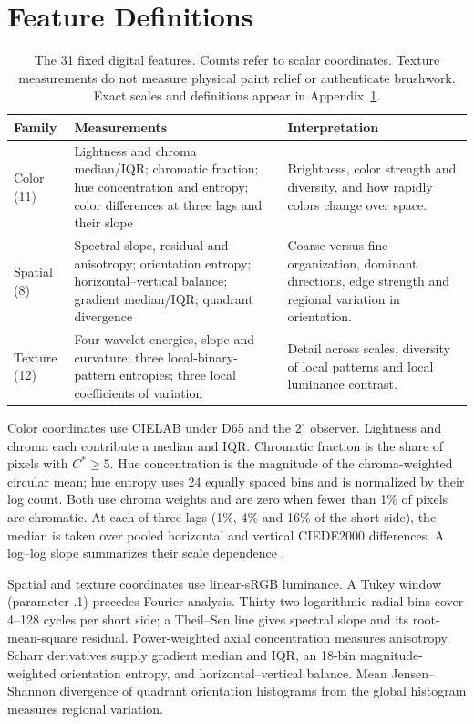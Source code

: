 \section{Feature Definitions}\label{app:features}
\begin{table}[!htbp]
\caption{The 31 fixed digital features. Counts refer to scalar coordinates.
Texture measurements do not measure physical paint relief or authenticate brushwork.
Exact scales and definitions appear in Appendix~\ref{app:features}.}
\label{tab:features}

\centering\small
\begin{tabularx}{\linewidth}{@{}>{\raggedright\arraybackslash}p{.15\linewidth}>{\raggedright\arraybackslash}p{.35\linewidth}>{\raggedright\arraybackslash}X@{}}
\toprule
Family & Measurements & Interpretation\\
\midrule
Color (11) & Lightness and chroma median/IQR; chromatic fraction; hue
concentration and entropy; color differences at three lags and their slope &
Brightness, color strength and diversity, and how rapidly colors change over space.\\[4pt]
Spatial (8) & Spectral slope, residual and anisotropy; orientation entropy;
horizontal--vertical balance; gradient median/IQR; quadrant divergence &
Coarse versus fine organization, dominant directions, edge strength and regional
variation in orientation.\\[4pt]
Texture (12) & Four wavelet energies, slope and curvature; three local-binary-pattern
entropies; three local coefficients of variation &
Detail across scales, diversity of local patterns and local luminance contrast.\\
\bottomrule
\end{tabularx}


\end{table}

Color coordinates use CIELAB under D65 and the $2^\circ$ observer. Lightness
and chroma each contribute a median and IQR. Chromatic fraction is the share
of pixels with $C^*\geq5$. Hue concentration is the magnitude of the
chroma-weighted circular mean; hue entropy uses 24 equally spaced bins and is
normalized by their log count. Both use chroma weights and are zero when fewer
than 1\% of pixels are chromatic. At each of three lags (1\%, 4\% and 16\% of
the short side), the median is taken over pooled horizontal and vertical
CIEDE2000 differences. A log--log slope summarizes their
scale dependence \citep{sharma2005ciede}.

Spatial and texture coordinates use linear-sRGB luminance. A Tukey window
(parameter .1) precedes Fourier analysis. Thirty-two logarithmic radial bins
cover 4--128 cycles per short side; a Theil--Sen line gives spectral slope and
its root-mean-square residual. Power-weighted axial concentration measures
anisotropy. Scharr derivatives supply gradient median and IQR, an 18-bin
magnitude-weighted orientation entropy, and horizontal--vertical balance. Mean
Jensen--Shannon divergence of quadrant orientation histograms from the global
histogram measures regional variation.

